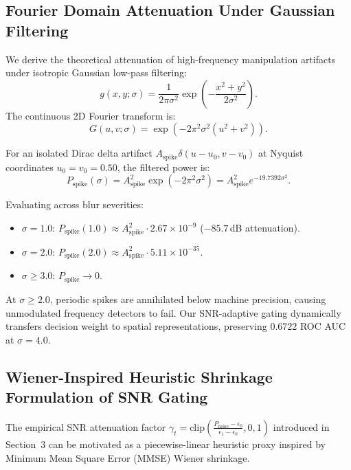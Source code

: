 \documentclass[10pt,twocolumn,letterpaper]{article}
\begin{document}
\subsection{Fourier Domain Attenuation Under Gaussian Filtering}
We derive the theoretical attenuation of high-frequency manipulation artifacts under isotropic Gaussian low-pass filtering:
\begin{equation}
\label{eq:gaussian_kernel}
g(x, y; \sigma) = \frac{1}{2\pi\sigma^2} \exp\left( -\frac{x^2 + y^2}{2\sigma^2} \right).
\end{equation}
The continuous 2D Fourier transform is:
\begin{equation}
\label{eq:gaussian_fourier}
G(u, v; \sigma) = \exp\left( -2\pi^2\sigma^2 (u^2 + v^2) \right).
\end{equation}
\begin{samepage}
For an isolated Dirac delta artifact $A_{\mathrm{spike}} \delta(u - u_0, v - v_0)$ at Nyquist coordinates $u_0 = v_0 = 0.50$, the filtered power is:
\begin{equation}
\label{eq:spike_attenuation_db}
P_{\mathrm{spike}}(\sigma) = A_{\mathrm{spike}}^2 \exp(-2\pi^2\sigma^2) = A_{\mathrm{spike}}^2 e^{-19.7392 \sigma^2}.
\end{equation}
\end{samepage}
Evaluating across blur severities:
\begin{itemize}
\item $\sigma = 1.0$: $P_{\mathrm{spike}}(1.0) \approx A_{\mathrm{spike}}^2 \cdot 2.67 \times 10^{-9}$ ($-85.7$\,dB attenuation).
\item $\sigma = 2.0$: $P_{\mathrm{spike}}(2.0) \approx A_{\mathrm{spike}}^2 \cdot 5.11 \times 10^{-35}$.
\item $\sigma \ge 3.0$: $P_{\mathrm{spike}} \to 0$.
\end{itemize}
At $\sigma \ge 2.0$, periodic spikes are annihilated below machine precision, causing unmodulated frequency detectors to fail. Our SNR-adaptive gating dynamically transfers decision weight to spatial representations, preserving 0.6722 ROC AUC at $\sigma = 4.0$.

\subsection{Wiener-Inspired Heuristic Shrinkage Formulation of SNR Gating}
\label{app:wiener_derivation}
The empirical SNR attenuation factor $\gamma_t = \mathrm{clip}\left(\frac{P_{\mathrm{noise}} - \epsilon_0}{\epsilon_1 - \epsilon_0}, 0, 1\right)$ introduced in Section~3 can be motivated as a piecewise-linear heuristic proxy inspired by Minimum Mean Square Error (MMSE) Wiener shrinkage. 
\end{document}
